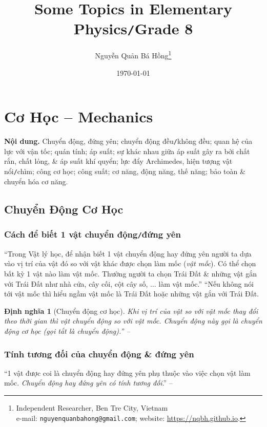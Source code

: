 \documentclass{article}
\title{Some Topics in Elementary Physics\texttt{/}Grade 8}
\author{Nguyễn Quản Bá Hồng\footnote{Independent Researcher, Ben Tre City, Vietnam\\e-mail: \texttt{nguyenquanbahong@gmail.com}; website: \url{https://nqbh.github.io}.}}
\date{\today}
\numberwithin{equation}{section}
\newtheorem{dinhnghia}{Định nghĩa}[section]
\begin{document}
\maketitle
\begin{abstract}
	
\end{abstract}
\setcounter{secnumdepth}{4}
\setcounter{tocdepth}{3}
\tableofcontents
\newpage


\section{Cơ Học -- Mechanics}
\textsf{\textbf{Nội dung.} Chuyển động, đứng yên; chuyển động đều\texttt{/}không đều; quan hệ của lực với vận tốc; quán tính; áp suất; sự khác nhau giữa áp suất gây ra bởi chất rắn, chất lỏng, \& áp suất khí quyển; lực đẩy Archimedes, hiện tượng vật nổi\texttt{/}chìm; công cơ học; công suất; cơ năng, động năng, thế năng; bảo toàn \& chuyển hóa cơ năng.}

\subsection{Chuyển Động Cơ Học}

\subsubsection{Cách để biết 1 vật chuyển động\texttt{/}đứng yên}
``Trong Vật lý học, để nhận biết 1 vật chuyển động hay đứng yên người ta dựa vào vị trí của vật đó so với vật khác được chọn làm mốc (\textit{vật mốc}). Có thể chọn bất kỳ 1 vật nào làm vật mốc. Thường người ta chọn Trái Đất \& những vật gắn với Trái Đất như nhà cửa, cây cối, cột cây số, $\ldots$ làm vật mốc.'' ``Nếu không nói tới vật mốc thì hiểu ngầm vật mốc là Trái Đất hoặc những vật gắn với Trái Đất.

\begin{dinhnghia}[Chuyển động cơ học]
	Khi vị trí của vật so với vật mốc thay đổi theo thời gian thì vật chuyển động so với vật mốc. Chuyển động này gọi là \emph{chuyển động cơ học} (gọi tắt là \emph{chuyển động}).'' -- \cite[p. 4]{SGK_Vat_Ly_8}
\end{dinhnghia}

\subsubsection{Tính tương đối của chuyển động \& đứng yên}
``1 vật được coi là chuyển động hay đứng yên phụ thuộc vào việc chọn vật làm mốc. \textit{Chuyển động hay đứng yên có tính tương đối}.'' -- \cite[p. 5]{SGK_Vat_Ly_8}
\end{document}
